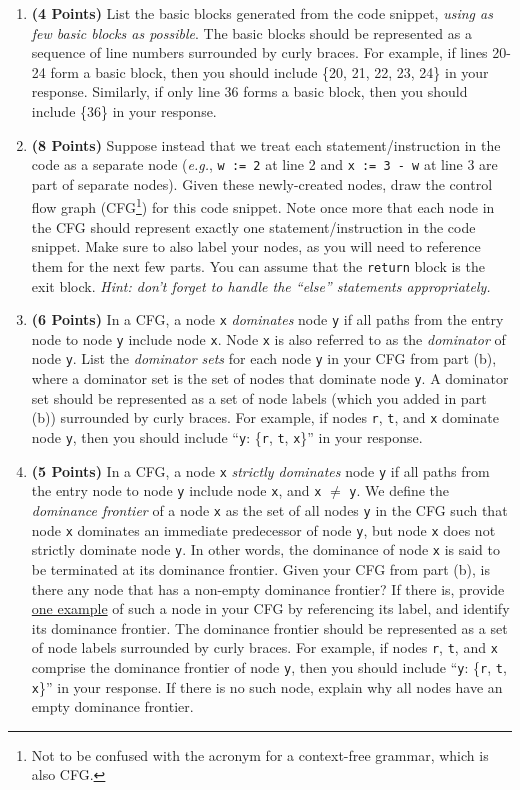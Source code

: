 \documentclass{article}[12pt]
\begin{document}
\begin{enumerate}
    \begin{enumerate}
        \item \textbf{(4 Points)} List the basic blocks generated from the code snippet, \textit{using as few basic blocks as possible}. The basic blocks should be represented as a sequence of line numbers surrounded by curly braces. For example, if lines 20-24 form a basic block, then you should include \{20, 21, 22, 23, 24\} in your response. Similarly, if only line 36 forms a basic block, then you should include \{36\} in your response.
        \item \textbf{(8 Points)} Suppose instead that we treat each statement/instruction in the code as a separate node (\textit{e.g.}, \texttt{w := 2} at line 2 and \texttt{x := 3 - w} at line 3 are part of separate nodes). Given these newly-created nodes, draw the control flow graph (CFG\footnote{Not to be confused with the acronym for a context-free grammar, which is also CFG.}) for this code snippet. Note once more that each node in the CFG should represent exactly one statement/instruction in the code snippet. Make sure to also label your nodes, as you will need to reference them for the next few parts. You can assume that the \texttt{return} block is the exit block. \textit{Hint: don't forget to handle the ``else'' statements appropriately.}
        \item \textbf{(6 Points)} In a CFG, a node \texttt{x} \textit{dominates} node \texttt{y} if all paths from the entry node to node \texttt{y} include node \texttt{x}. Node \texttt{x} is also referred to as the \textit{dominator} of node \texttt{y}. List the \textit{dominator sets} for each node \texttt{y} in your CFG from part (b), where a dominator set is the set of nodes that dominate node \texttt{y}. A dominator set should be represented as a set of node labels (which you added in part (b)) surrounded by curly braces. For example, if nodes \texttt{r}, \texttt{t}, and \texttt{x} dominate node \texttt{y}, then you should include ``\texttt{y}: \{\texttt{r}, \texttt{t}, \texttt{x}\}'' in your response.
        \item \textbf{(5 Points)} In a CFG, a node \texttt{x} \textit{strictly dominates} node \texttt{y} if all paths from the entry node to node \texttt{y} include node \texttt{x}, and \texttt{x} $\neq$ \texttt{y}. We define the \textit{dominance frontier} of a node \texttt{x} as the set of all nodes \texttt{y} in the CFG such that node \texttt{x} dominates an immediate predecessor of node \texttt{y}, but node \texttt{x} does not strictly dominate node \texttt{y}. In other words, the dominance of node \texttt{x} is said to be terminated at its dominance frontier. Given your CFG from part (b), is there any node that has a non-empty dominance frontier? If there is, provide \underline{one example} of such a node in your CFG by referencing its label, and identify its dominance frontier. The dominance frontier should be represented as a set of node labels surrounded by curly braces. For example, if nodes \texttt{r}, \texttt{t}, and \texttt{x} comprise the dominance frontier of node \texttt{y}, then you should include ``\texttt{y}: \{\texttt{r}, \texttt{t}, \texttt{x}\}'' in your response. If there is no such node, explain why all nodes have an empty dominance frontier.

\end{enumerate}
\end{enumerate}
\end{document}
